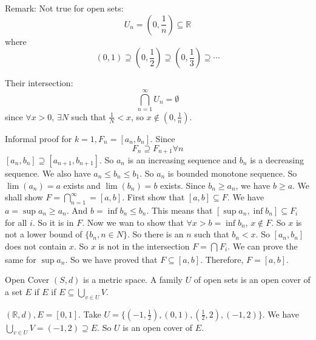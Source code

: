 \documentclass{report}
\begin{document}
Remark: Not true for open sets:
    \begin{equation*}
        U_{n} = (0, \dfrac{1}{n}) \subseteq \mathbb{R}
    \end{equation*}
where
    \begin{equation*}
        (0, 1) \supseteq (0, \dfrac{1}{2}) \supseteq (0, \dfrac{1}{3}) \supseteq  \cdots 
    \end{equation*}

Their intersection:
    \begin{equation*}
        \bigcap_{n = 1}^{\infty} U_{n} = \emptyset
    \end{equation*}
since $\forall x > 0$, $\exists N$ such that $\frac{1}{N} < x$, so $x \notin (0, \frac{1}{n})$.

Informal proof for $k = 1, F_{n} = [a_{n}, b_{n}]$. Since 
    \begin{equation*}
        F_{n} \supseteq F_{n + 1} \forall n
    \end{equation*}
$[a_{n}, b_{n}] \supseteq [a_{n + 1}, b_{n  + 1}]$. So $a_{n}$ is an increasing sequence and $b_{n}$ is a decreasing sequence. We also have $a_{n} \leq b_{n} \leq b_{1}$. So $a_{n}$ is bounded monotone sequence. So $\lim(a_{n}) = a$ exists and $\lim(b_{n}) = b$ exists. Since $b_{n} \geq a_{n}$, we have $b \geq a$. We shall show $F = \bigcap_{n = 1}^{\infty}  = [a, b]$. First show that $[a, b] \subseteq F$. We have $a = \sup a_{n} \geq a_{n}$. And $b =  \inf b_{n} \leq b_{n}$. This means that $[\sup a_{n},  \inf b_{n}] \subseteq F_{i}$ for all $i$. So it is in $F$. Now we wan to show that $\forall x > b =  \inf b_{n}$, $x \notin F$. So $x$ is not a lower bound of $\{b_{n}, n \in N\}$. So there is an $n$ such that $b_{n} < x$. So $[a_{n}, b_{n}]$ does not contain $x$. So $x$ is not in the intersection $F = \bigcap_{}^{} F_{i}$. We can prove the same for $\sup a_{n}$. So we have proved that $F \subseteq [a, b]$. Therefore, $F = [a, b]$.

\begin{definition}{Open Cover}
    $(S, d)$ is a metric space. A family $U$ of open sets is an open cover of a set $E$ if $E$ if $E \subseteq \bigcup_{v \in U}^{} V$.
\end{definition}

\begin{examples}
    \begin{example}
        $(\mathbb{R}, d), E  = [0, 1]$. Take $U = \{(-1, \frac{1}{2}), (0, 1), (\frac{1}{2}, 2), (-1, 2)\}$. We have $\bigcup_{v \in U}^{}  V = (-1, 2) \supseteq E$. So $U$ is an open cover of $E$.
    \end{example}
\end{examples}
\end{document}
